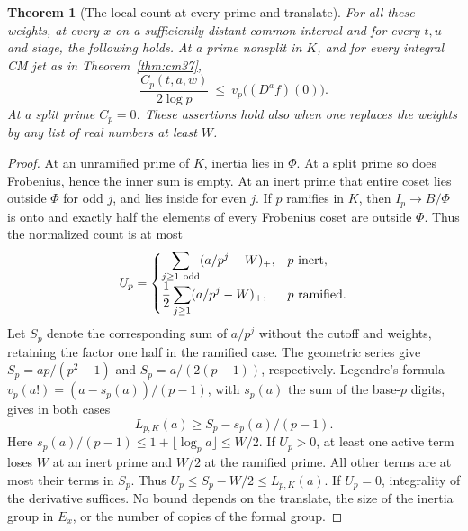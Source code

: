 \documentclass[a4paper,11pt]{article}
\newtheorem{theorem}[proposition]{Theorem}
\theoremstyle{definition}
\theoremstyle{remark}
\numberwithin{equation}{section}
\begin{document}
\begin{theorem}[The local count at every prime and translate]\label{thm:count37}
For all these weights, at every \(x\) on a sufficiently distant common interval and for every \(t,u\) and stage, the following holds. At a prime nonsplit in \(K\), and for every integral CM jet as in Theorem~\ref{thm:cm37},
\[
             \frac{C_p(t,a,w)}{2\log p}
                    \ \le\ v_p\big((D^a f)(0)\big).
\]
At a split prime \(C_p=0\). These assertions hold also when one replaces the weights by any list of real numbers at least \(W\).
\end{theorem}
\begin{proof}
At an unramified prime of \(K\), inertia lies in \(\Phi\). At a split prime so does Frobenius, hence the inner sum is empty. At an inert prime that entire coset lies outside \(\Phi\) for odd \(j\), and lies inside for even \(j\). If \(p\) ramifies in \(K\), then \(I_p\to B/\Phi\) is onto and exactly half the elements of every Frobenius coset are outside \(\Phi\). Thus the normalized count is at most
\[
 U_p=\begin{cases}
       \displaystyle\sum_{j\ge1\ {\rm odd}}(a/p^j-W)_+,&p\text{ inert},\\
       \displaystyle\frac12\sum_{j\ge1}(a/p^j-W)_+,&p\text{ ramified}.
      \end{cases}
\]
Let \(S_p\) denote the corresponding sum of \(a/p^j\) without the cutoff and weights, retaining the factor one half in the ramified case. The geometric series give \(S_p=ap/(p^2-1)\) and \(S_p=a/(2(p-1))\), respectively. Legendre's formula \(v_p(a!)=(a-s_p(a))/(p-1)\), with \(s_p(a)\) the sum of the base-\(p\) digits, gives in both cases
\[
                 L_{p,K}(a)\ge S_p-s_p(a)/(p-1).
\]
Here \(s_p(a)/(p-1)\le1+\lfloor\log_p a\rfloor\le W/2\). If \(U_p>0\), at least one active term loses \(W\) at an inert prime and \(W/2\) at the ramified prime. All other terms are at most their terms in \(S_p\). Thus \(U_p\le S_p-W/2\le L_{p,K}(a)\). If \(U_p=0\), integrality of the derivative suffices. No bound depends on the translate, the size of the inertia group in \(E_x\), or the number of copies of the formal group.
\end{proof}
\end{document}
